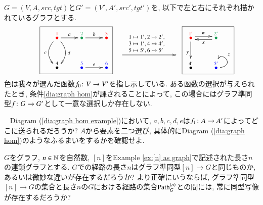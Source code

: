 \begin{example}[グラフ準同型]\label{ex:graph hom}

$G=(V,A,src,tgt)$と$G'=(V',A',src',tgt')$を, 以下で左と右にそれぞれ描かれているグラフとする.
\begin{align}\label{dia:graph hom example}
\parbox{1.5in}{\fbox{\xymatrix{\LMO{\color{red}{1}}\ar[r]^a\ar@/^1pc/[d]^d\ar@/_1pc/[d]_c&\LMO{\color{ForestGreen}{2}}\ar[r]^b&\LMO{\color{red}{3}}\\\LMO{4}&\LMO{\color{blue}{5}}\ar[r]^e&\LMO{\color{blue}{6}}}}}
\parbox{1in}{\xymatrix{~\ar[rr]^{\parbox{.8in}{\vspace{-.2in}\footnotesize$1\mapsto 1', 2\mapsto 2',\\ 3\mapsto 1',4\mapsto 4',\\ 5\mapsto 5',6\mapsto5'$}}&\hsp&~}}
\parbox{.8in}{\fbox{\xymatrix{\LMO{\color{red}{1'}}\ar@<.5ex>[r]^w\ar[d]_y&\LMO{\color{ForestGreen}{2'}}\ar@<.5ex>[l]^x\\\LMO{4'}&\LMO{\color{blue}{5'}}\ar@(r,u)[]_z}}}
\end{align}
色は我々が選んだ函数$f_0\colon V\rightarrow V'$を指し示している. ある函数の選択が与えられたとき, 条件\eqref{dia:graph hom}が課されることによって, この場合にはグラフ準同型$f\colon G\rightarrow G'$として一意な選択しか存在しない.

\end{example}

\begin{exercise}~
\sexc Diagram (\ref{dia:graph hom example})において, $a,b,c,d,e$は$f_1\colon A\rightarrow A'$によってどこに送られるだろうか? 
\next $A$から要素を二つ選び, 具体的にDiagram (\ref{dia:graph hom})のようなふるまいをするかを確認せよ.
\endsexc
\end{exercise}

\begin{exercise}
$G$をグラフ, $n\in{\mathbb N}$を自然数, $[n]$をExample \ref{ex:[n] as graph}で記述された長さ$n$の連鎖グラフとする. $G$での経路の長さ$n$はグラフ準同型$[n]\to G$と同じものか, あるいは微妙な違いが存在するだろうか? より正確にいうならば, グラフ準同型$[n]\to G$の集合と長さ$n$の$G$における経路の集合$\Path_G^{(n)}$との間には, 常に同型写像が存在するだろうか?
\end{exercise}

